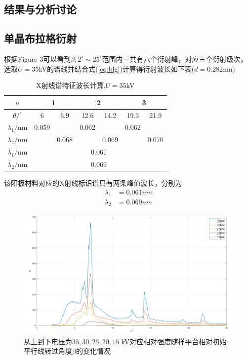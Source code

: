 \documentclass{whureport}
\begin{document}
\begin{multicols}{2}
	\section{结果与分析讨论}
	\subsection{单晶布拉格衍射}
	根据Figure 3可以看到$\beta:2^\circ\sim25^\circ$范围内一共有六个衍射峰，对应三个衍射级次，选取$U=35 $kV的谱线并结合式(\ref{eq:blg})计算得衍射波长如下表($d=0.282 $nm)
	\begin{table}[htbp]
		\centering
		\caption{X射线谱特征波长计算,$U=35 $kV}
		\begin{tabular}{|c|c|c|c|c|c|c|}
			\hline
			$n$     & \multicolumn{2}{c|}{1} & \multicolumn{2}{c|}{2} & \multicolumn{2}{c|}{3} \bigstrut\\
			\hline
			$\theta/^\circ$ & 6     & 6.9   & 12.6  & 14.2  & 19.3  & 21.9 \bigstrut\\
			\hline
			$\lambda_1/\text{nm}$ & 0.059  &       & 0.062  &       & 0.062  &  \bigstrut\\
			\hline
			$\lambda_2/\text{nm}$ &       & 0.068  &       & 0.069  &       & 0.070  \bigstrut\\
			\hline
			$\overline{\lambda}_1/\text{nm}$& \multicolumn{6}{c|}{0.061 } \bigstrut\\
			\hline
			$\overline{\lambda}_2/\text{nm}$& \multicolumn{6}{c|}{0.069 } \bigstrut\\
			\hline
		\end{tabular}%
	\end{table}%
	
	该阳极材料对应的X射线标识谱只有两条峰值波长，分别为
	\begin{align}
		\lambda_1&=0.061\unit{nm}\\
		\lambda_2&=0.069\unit{nm}
	\end{align}
\end{multicols}
	\begin{figure}[H]
		\centering
		\includegraphics[width = \textwidth]{voltage.png}
		\captionsetup{font=footnotesize}
		\caption{从上到下电压为$35,30,25,20,15$ kV对应相对强度随样平台相对初始平行线转过角度$\beta$的变化情况}
		\label{fig:voltage}
	\end{figure}
\end{document}
